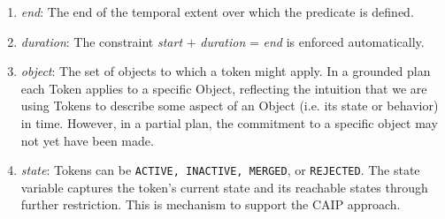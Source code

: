 \begin{description}
\begin{enumerate}
  \item \textit {end}: The end of the temporal extent over which the
    predicate is defined.

  \item \textit {duration}: The constraint \textit{start} $+$
    \textit{duration} = \textit{end} is enforced automatically.

  \item \textit{object}: The set of objects to which a token might
    apply. In a grounded plan each Token applies to a specific Object,
    reflecting the intuition that we are using Tokens to describe some
    aspect of an Object (i.e. its state or behavior) in time. However,
    in a partial plan, the commitment to a specific object may not yet
    have been made.

  \item \textit{state}: Tokens can be \texttt{ACTIVE, INACTIVE,
      MERGED}, or \texttt{REJECTED}. The state variable captures the
    token's current state and its reachable states through further
    restriction.  This is \eus mechanism to support the CAIP approach.

\end{enumerate}










\end{description}
